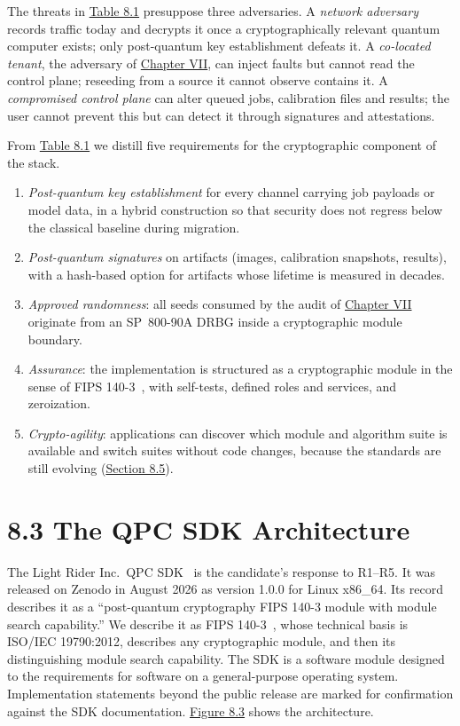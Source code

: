 \documentclass{report}
\theoremstyle{plain}
\theoremstyle{definition}
\theoremstyle{remark}
\begin{document}
The threats in \hyperref[tab:pqc:assets]{Table 8.1} presuppose three adversaries. A \emph{network adversary} records traffic today and decrypts it once a cryptographically relevant quantum computer exists; only post-quantum key establishment defeats it. A \emph{co-located tenant}, the adversary of \hyperref[ch:qec]{Chapter VII}, can inject faults but cannot read the control plane; reseeding from a source it cannot observe contains it. A \emph{compromised control plane} can alter queued jobs, calibration files and results; the user cannot prevent this but can detect it through signatures and attestations.

From \hyperref[tab:pqc:assets]{Table 8.1} we distill five requirements for the cryptographic component of the stack.
\begin{enumerate}
\item[R1] \emph{Post-quantum key establishment} for every channel carrying job payloads or model data, in a hybrid construction so that security does not regress below the classical baseline during migration.
\item[R2] \emph{Post-quantum signatures} on artifacts (images, calibration snapshots, results), with a hash-based option for artifacts whose lifetime is measured in decades.
\item[R3] \emph{Approved randomness}: all seeds consumed by the audit of \hyperref[ch:qec]{Chapter VII} originate from an SP~800-90A DRBG inside a cryptographic module boundary.
\item[R4] \emph{Assurance}: the implementation is structured as a cryptographic module in the sense of FIPS 140-3~\cite{nist2019fips1403}, with self-tests, defined roles and services, and zeroization.
\item[R5] \emph{Crypto-agility}: applications can discover which module and algorithm suite is available and switch suites without code changes, because the standards are still evolving (\hyperref[sec:pqc:timeline]{Section 8.5}).
\end{enumerate}

\section{8.3 The QPC SDK Architecture}\label{sec:pqc:sdk}

The Light Rider Inc.\ QPC SDK~\cite{guo2026lightriderqpc} is the candidate's response to R1--R5. It was released on Zenodo in August 2026 as version 1.0.0 for Linux x86\_64. Its record describes it as a ``post-quantum cryptography FIPS 140-3 module with module search capability.'' We describe it as FIPS 140-3~\cite{nist2019fips1403}, whose technical basis is ISO/IEC 19790:2012, describes any cryptographic module, and then its distinguishing module search capability. The SDK is a software module designed to the requirements for software on a general-purpose operating system. Implementation statements beyond the public release are marked for confirmation against the SDK documentation. \hyperref[fig:pqc:sdk]{Figure 8.3} shows the architecture.
\end{document}
